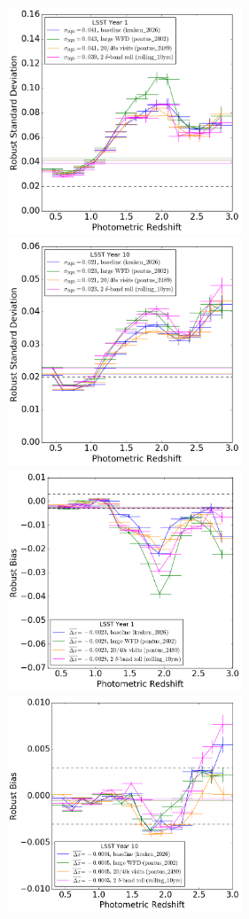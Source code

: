 \begin{figure}
\begin{center}
\includegraphics[width=7cm,trim={0cm 0cm 0cm 0cm},clip]{figures/year1_IQRs.png}
\includegraphics[width=7cm,trim={0cm 0cm 0cm 0cm},clip]{figures/year10_IQRs.png}
\includegraphics[width=7cm,trim={0cm 0cm 0cm 0cm},clip]{figures/year1_bias.png}
\includegraphics[width=7cm,trim={0cm 0cm 0cm 0cm},clip]{figures/year10_bias.png}

\end{center}
\end{figure}
